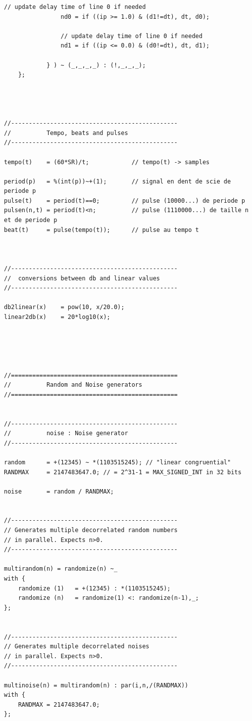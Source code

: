 \documentclass{article}
\begin{document}
\begin{lstlisting}[caption=\texttt{music.lib}]
				// update delay time of line 0 if needed
				nd0 = if ((ip >= 1.0) & (d1!=dt), dt, d0);

				// update delay time of line 0 if needed
				nd1 = if ((ip <= 0.0) & (d0!=dt), dt, d1);

			} ) ~ (_,_,_,_) : (!,_,_,_);
	};




//-----------------------------------------------
// 			Tempo, beats and pulses
//-----------------------------------------------

tempo(t) 	= (60*SR)/t;			// tempo(t) -> samples

period(p) 	= %(int(p))~+(1);		// signal en dent de scie de periode p
pulse(t) 	= period(t)==0;			// pulse (10000...) de periode p
pulsen(n,t) = period(t)<n;			// pulse (1110000...) de taille n et de periode p
beat(t) 	= pulse(tempo(t));		// pulse au tempo t



//-----------------------------------------------
// 	conversions between db and linear values
//-----------------------------------------------

db2linear(x)	= pow(10, x/20.0);
linear2db(x)	= 20*log10(x);





//===============================================
// 			Random and Noise generators
//===============================================


//-----------------------------------------------
// 			noise : Noise generator
//-----------------------------------------------

random 		= +(12345) ~ *(1103515245); // "linear congruential"
RANDMAX		= 2147483647.0; // = 2^31-1 = MAX_SIGNED_INT in 32 bits

noise 		= random / RANDMAX;


//-----------------------------------------------
// Generates multiple decorrelated random numbers 
// in parallel. Expects n>0.
//-----------------------------------------------

multirandom(n) = randomize(n) ~_
with {
	randomize (1) 	= +(12345) : *(1103515245);
	randomize (n) 	= randomize(1) <: randomize(n-1),_;
};


//-----------------------------------------------
// Generates multiple decorrelated noises
// in parallel. Expects n>0.
//-----------------------------------------------

multinoise(n) = multirandom(n) : par(i,n,/(RANDMAX)) 
with { 
	RANDMAX = 2147483647.0; 
};



\end{lstlisting}
\end{document}

